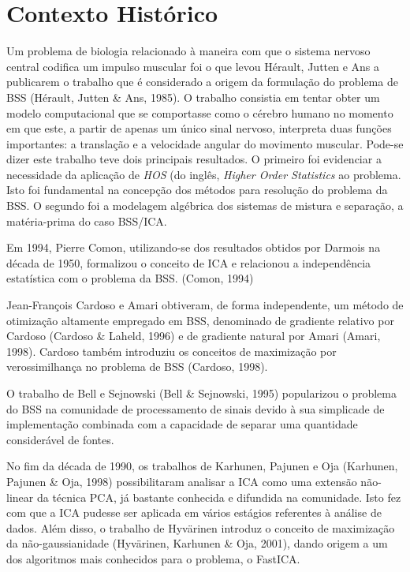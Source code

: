 
\section{Contexto Histórico}

    Um problema de biologia relacionado à maneira com que o sistema nervoso central codifica um impulso muscular foi o que levou Hérault, Jutten e Ans a publicarem o trabalho que é considerado a origem da formulação do problema de BSS (Hérault, Jutten \& Ans, 1985). O trabalho consistia em tentar obter um modelo computacional que se comportasse como o cérebro humano no momento em que este, a partir de apenas um único sinal nervoso, interpreta duas funções importantes: a translação e a velocidade angular do movimento muscular. Pode-se dizer este trabalho teve dois principais resultados. O primeiro foi evidenciar a necessidade da aplicação de \textit{HOS} (do inglês, \textit{Higher Order Statistics} ao problema. Isto foi fundamental na concepção dos métodos para resolução do problema da BSS. O segundo foi a modelagem algébrica dos sistemas de mistura e separação, a matéria-prima do caso BSS/ICA.


    Em 1994, Pierre Comon, utilizando-se dos resultados obtidos por Darmois na década de 1950, formalizou o conceito de ICA e relacionou a independência estatística com o problema da BSS. (Comon, 1994)
    
    
    Jean-François Cardoso e Amari obtiveram, de forma independente, um método de otimização altamente empregado em BSS, denominado de gradiente relativo por Cardoso (Cardoso \& Laheld, 1996) e de gradiente natural por Amari (Amari, 1998). Cardoso também introduziu os conceitos de maximização por verossimilhança no problema de BSS (Cardoso, 1998).
    
    
    O trabalho de Bell e Sejnowski (Bell \& Sejnowski, 1995) popularizou o problema do BSS na comunidade de processamento de sinais devido à sua simplicade de implementação combinada com a capacidade de separar uma quantidade considerável de fontes.
    
    No fim da década de 1990, os trabalhos de Karhunen, Pajunen e Oja  (Karhunen, Pajunen \& Oja, 1998) possibilitaram analisar a ICA como uma extensão não-linear da técnica PCA, já bastante conhecida e difundida na comunidade. Isto fez com que a ICA pudesse ser aplicada em vários estágios referentes à análise de dados. Além disso,  o trabalho de  Hyvärinen introduz o conceito de maximização da não-gaussianidade (Hyvärinen, Karhunen \& Oja, 2001), dando origem a um dos algoritmos mais conhecidos para o problema, o FastICA.
    
